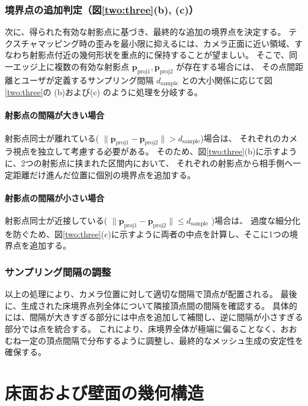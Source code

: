 \subsubsection*{境界点の追加判定（図\ref{two:three}(b), (c)）}

次に、得られた有効な射影点に基づき、最終的な追加の境界点を決定する。
テクスチャマッピング時の歪みを最小限に抑えるには、カメラ正面に近い領域、すなわち射影点付近の幾何形状を重点的に保持することが望ましい。
そこで、同一エッジ上に複数の有効な射影点 $\bm{p}_{\mathrm{proj1}}, \bm{p}_{\mathrm{proj2}}$ が存在する場合には、
その点間距離とユーザが定義するサンプリング間隔 $d_{\mathrm{sample}}$ との大小関係に応じて図\ref{two:three}の (b)および(c) のように処理を分岐する。

\paragraph{射影点の間隔が大きい場合}
射影点同士が離れている( $\|\bm{p}_{\mathrm{proj1}} - \bm{p}_{\mathrm{proj2}}\| > d_{\mathrm{sample}}$)場合は、
それぞれのカメラ視点を独立して考慮する必要がある。
そのため、図\ref{two:three}(b)に示すように、2つの射影点に挟まれた区間内において、
それぞれの射影点から相手側へ一定距離だけ進んだ位置に個別の境界点を追加する。

\paragraph{射影点の間隔が小さい場合}
射影点同士が近接している( $\|\bm{p}_{\mathrm{proj1}} - \bm{p}_{\mathrm{proj2}}\| \leq d_{\mathrm{sample}}$ )場合は、
過度な細分化を防ぐため、図\ref{two:three}(c)に示すように両者の中点を計算し、そこに1つの境界点を追加する。


\subsubsection*{サンプリング間隔の調整} 
以上の処理により、カメラ位置に対して適切な間隔で頂点が配置される。
最後に、生成された床境界点列全体について隣接頂点間の間隔を確認する。
具体的には、間隔が大きすぎる部分には中点を追加して補間し、逆に間隔が小さすぎる部分では点を統合する。
これにより、床境界全体が極端に偏ることなく、おおむね一定の頂点間隔で分布するように調整し、最終的なメッシュ生成の安定性を確保する。


\section{床面および壁面の幾何構造}

